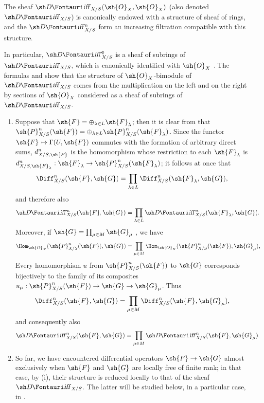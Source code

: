\begin{corollary}[16.8.10]
\label{IV.16.8.10}
The sheaf $\shDiff_{X/S}(\sh{O}_X, \sh{O}_X)$ (also denoted $\shDiff_{X/S}$) is canonically endowed with a structure of sheaf of rings, and the $\shDiff_{X/S}^n$ form an increasing filtration compatible with this structure.
\end{corollary}

In particular, $\shDiff_{X/S}^0$ is a sheaf of subrings of $\shDiff_{X/S}$, which is canonically identified with $\sh{O}_X$ .
The formulas  and  show that the structure of $\sh{O}_X$-bimodule of $\shDiff_{X/S}$ comes from the multiplication on the left and on the right by sections of $\sh{O}_X$ considered as a sheaf of subrings of $\shDiff_{X/S}$.

\begin{remarks}[16.8.11]
\label{IV.16.8.11}
\begin{enumerate}
  \item[\rm{(i)}] Suppose that $\sh{F} = \oplus_{\lambda \in L} \sh{F}_\lambda$;
  then it is clear from  that $\sh{P}_{X/S}^n(\sh{F}) = \oplus_{\lambda \in L} \sh{P}_{X/S}^n(\sh{F}_\lambda)$.
  Since the functor $\sh{F} \mapsto \Gamma(U, \sh{F})$ commutes with the formation of arbitrary direct sums, $d_{X/S, \sh{F}}^n$ is the homomorphism whose restriction to each $\sh{F}_\lambda$ is $d_{X/S, \sh{F}_\lambda}^n: \sh{F}_\lambda \to \sh{P}_{X/S}^n(\sh{F}_\lambda)$;
  it follows at once that
  \[
    \Diff_{X/S}^n (\sh{F}, \sh{G}) = \prod_{\lambda \in L} \Diff_{X/S}^n (\sh{F}_\lambda, \sh{G}),
  \]
  and therefore also 
  \[
    \shDiff_{X/S}^n (\sh{F}, \sh{G}) = \prod_{\lambda \in L} \shDiff_{X/S}^n (\sh{F}_\lambda, \sh{G}).
  \]
  Moreover, if $\sh{G} = \prod_{\mu \in M} \sh{G}_\mu$ , we have
  \[
    \Hom_{\sh{O}_X}(\sh{P}_{X/S}^n(\sh{F}), \sh{G}) = \prod_{\mu \in M} \Hom_{\sh{O}_X}(\sh{P}_{X/S}^n(\sh{F}), \sh{G}_\mu),
  \]
  Every homomorphism $u$ from $\sh{P}_{X/S}^n(\sh{F})$ to $\sh{G}$ corresponds bijectively to the family of its composites $u_\mu: \sh{P}_{X/S}^n(\sh{F}) \to \sh{G} \to \sh{G}_\mu$.
  Thus
  \[
    \Diff_{X/S}^n(\sh{F}, \sh{G}) = \prod_{\mu \in M} \Diff_{X/S}^n(\sh{F}, \sh{G}_\mu),
  \]
  and consequently also
  \[
    \shDiff_{X/S}^n(\sh{F}, \sh{G}) = \prod_{\mu \in M} \shDiff_{X/S}^n(\sh{F}, \sh{G}_\mu).
  \]
  \item[\rm{(ii)}]
  So far, we have encountered differential operators $\sh{F} \to \sh{G}$ almost exclusively when $\sh{F}$ and $\sh{G}$ are locally free of finite rank; in that case, by \rm{(i)}, their structure is reduced locally to that of the sheaf $\shDiff_{X/S}$.
  The latter will be studied below, in a particular case, in .
\end{enumerate}
\end{remarks}

